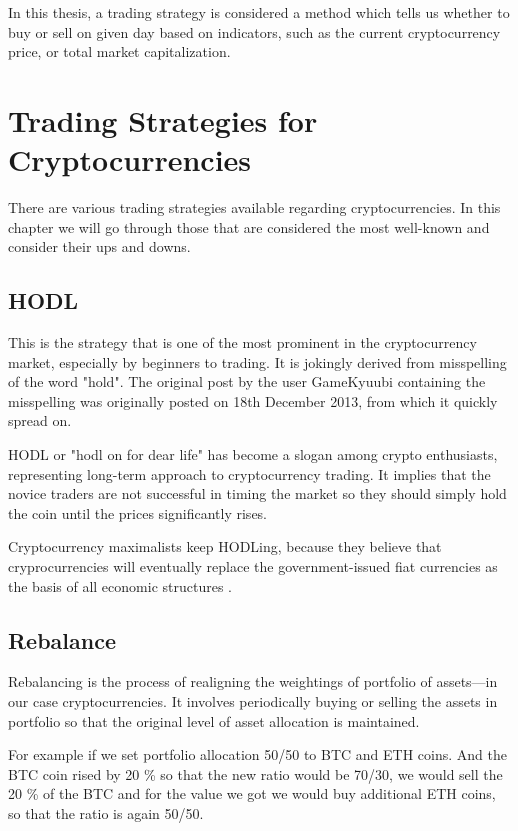 In this thesis, a trading strategy is considered a method which tells us whether to buy or sell on given day based on indicators, such as the current cryptocurrency price, or total market capitalization.

\chapter{Trading Strategies for Cryptocurrencies}
\label{chapter-trading-stategies}

There are various trading strategies available regarding cryptocurrencies.
In this chapter we will go through those that are considered the most well-known and consider
their ups and downs.

\section{HODL}

This is the strategy that is one of the most prominent in the cryptocurrency market, especially by beginners to trading.
It is jokingly derived from misspelling of the word "hold". The original post by the user GameKyuubi \cite{hodl-post} containing the misspelling was originally posted on 18th December 2013, from which it quickly spread on.

HODL or "hodl on for dear life" has become a slogan among crypto enthusiasts, representing long-term approach to cryptocurrency trading. It implies that the novice traders are not successful in timing the market so they should simply hold the coin until the prices significantly rises.

Cryptocurrency maximalists keep HODLing, because they believe that cryprocurrencies will eventually replace the government-issued fiat currencies as the basis of all economic structures \cite{investopedia-hodl}.

\section{Rebalance}
Rebalancing is the process of realigning the weightings of portfolio of assets---in our case cryptocurrencies. It involves periodically buying or selling the assets in portfolio so that the original level of asset allocation is maintained\cite{investopedia-rebalancing}.

For example if we set portfolio allocation 50/50 to BTC and ETH coins. And the BTC coin rised by 20 \% so that the new ratio would be 70/30, we would sell the 20 \% of the BTC and for the value we got we would buy additional ETH coins, so that the ratio is again 50/50.

